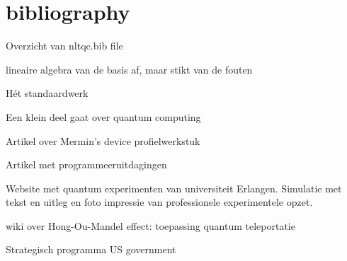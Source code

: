 \documentclass[../main.tex]{subfiles}
\begin{document}
\onlyinsubfile{
\setcounter{chapter}{8}
}
\notinsubfile{}
\chapter{bibliography}
Overzicht van nltqc.bib file


\cite{mcmahon2007quantum} lineaire algebra van de basis af, maar stikt van de fouten

\cite{brylinski2002mathematics}

\cite{nielsen2010quantum} H\'et standaardwerk

\cite{fano2017twenty} Een klein deel gaat over quantum computing

\cite{berman1998introduction}

\cite{bernhardt2019quantum}

\cite{bernhardt2019quantum} Artikel over Mermin's device profielwerkstuk

\cite{candela2015undergraduate} Artikel met programmeeruitdagingen

\cite{}



\cite{quantumtumlab2020erlangen}
Website met quantum experimenten van universiteit Erlangen. Simulatie  met tekst en uitleg  en foto impressie van professionele experimentele opzet. 

\cite{hong2020mandel} wiki over Hong-Ou-Mandel effect: toepassing quantum teleportatie

\cite{usgov2020} Strategisch programma US government 




%
%
\nocite{*}%
\printbibliography
[heading=bibintoc,
title={Referenties}]
\end{document}
